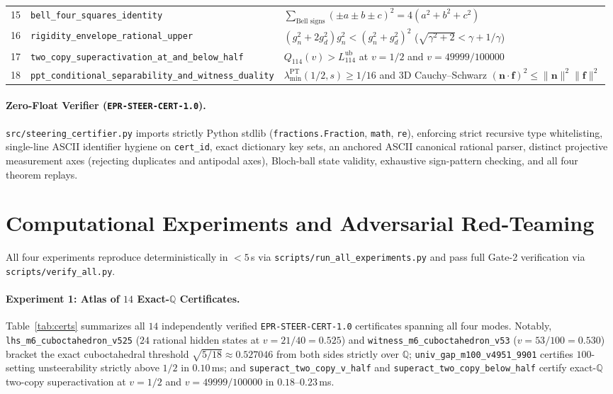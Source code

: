 \documentclass[11pt,a4paper]{article}
\theoremstyle{definition}
\theoremstyle{remark}
\newcommand{\QQ}{\mathbb{Q}}
\newcommand{\certschema}{\texttt{EPR-STEER-CERT-1.0}}
\begin{document}
\begin{table}[t]
{\begin{tabular}{@{}rll@{}}
15 & \texttt{bell\_four\_squares\_identity} & $\sum_{\text{Bell signs}}(\pm a \pm b \pm c)^2 = 4(a^2+b^2+c^2)$ \\
16 & \texttt{rigidity\_envelope\_rational\_upper} & $(g_n^2 + 2g_d^2) g_n^2 < (g_n^2 + g_d^2)^2$ ($\sqrt{\gamma^2+2} < \gamma + 1/\gamma$) \\
17 & \texttt{two\_copy\_superactivation\_at\_and\_below\_half} & $Q_{114}(v) > L_{114}^{\mathrm{ub}}$ at $v=1/2$ and $v=49999/100000$ \\
18 & \texttt{ppt\_conditional\_separability\_and\_witness\_duality} & $\lambda_{\min}^{\mathrm{PT}}(1/2, s) \ge 1/16$ and $3$D Cauchy--Schwarz $(\mathbf{n}\cdot\mathbf{f})^2 \le \|\mathbf{n}\|^2\|\mathbf{f}\|^2$ \\
\bottomrule
\end{tabular}}
\end{table}

\paragraph{Zero-Float Verifier (\certschema{}).}
\texttt{src/steering\_certifier.py} imports strictly Python stdlib (\texttt{fractions.\allowbreak Fraction}, \texttt{math}, \texttt{re}), enforcing strict recursive type whitelisting, single-line ASCII identifier hygiene on \texttt{cert\_id}, exact dictionary key sets, an anchored ASCII canonical rational parser, distinct projective measurement axes (rejecting duplicates and antipodal axes), Bloch-ball state validity, exhaustive sign-pattern checking, and all four theorem replays.

\section{Computational Experiments and Adversarial Red-Teaming}

All four experiments reproduce deterministically in $<5$\,s via \texttt{scripts/run\_\allowbreak all\_\allowbreak experiments.py} and pass full Gate-2 verification via \texttt{scripts/verify\_all.py}.

\paragraph{Experiment 1: Atlas of $14$ Exact-$\QQ$ Certificates.}
Table~\ref{tab:certs} summarizes all $14$ independently verified \certschema{} certificates spanning all four modes. Notably, \texttt{lhs\_m6\_\allowbreak cuboctahedron\_v525} ($24$ rational hidden states at $v = 21/40 = 0.525$) and \texttt{witness\_m6\_\allowbreak cuboctahedron\_v53} ($v = 53/100 = 0.530$) bracket the exact cuboctahedral threshold $\sqrt{5/18} \approx 0.527046$ from both sides strictly over $\QQ$; \texttt{univ\_gap\_m100\_\allowbreak v4951\_9901} certifies $100$-setting unsteerability strictly above $1/2$ in $0.10$\,ms; and \texttt{superact\_two\_\allowbreak copy\_v\_half} and \texttt{superact\_two\_\allowbreak copy\_below\_half} certify exact-$\QQ$ two-copy superactivation at $v = 1/2$ and $v = 49999/100000$ in $0.18$--$0.23$\,ms.
\end{document}
